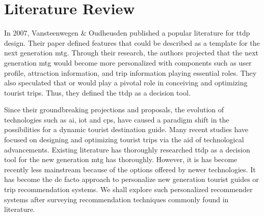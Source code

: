 
\chapter{Literature Review}\label{chapter:literature_review}
In 2007, Vansteenwegen \& Oudheusden\parencite{Vansteenwegen2007TheOpportunity} published a popular literature for \gls{ttdp} design. Their paper defined features that could be described as a template for the next generation \gls{mtg}. Through their research, the authors projected that the next generation \gls{mtg} would become more personalized with components such as user profile, attraction information, and trip information playing essential roles. They also speculated that \gls{or} would play a pivotal role in conceiving and optimizing tourist trips. Thus, they defined the \gls{ttdp} as a decision tool.

Since their groundbreaking projections and proposals, the evolution of technologies such as \gls{ai}, \gls{iot} and \gls{cps}, have caused a paradigm shift in the possibilities for a dynamic tourist destination guide. Many recent studies have focused on designing and optimizing tourist trips via the aid of technological advancements.  Existing literature has thoroughly researched \Gls{ttdp} as a decision tool for the new generation \gls{mtg} has thoroughly. However, it is has become recently less mainstream because of the options offered by newer technologies. It has become the de facto approach to personalize new generation tourist guides or trip recommendation systems. We shall explore such personalized recommender systems after surveying recommendation techniques commonly found in literature.

